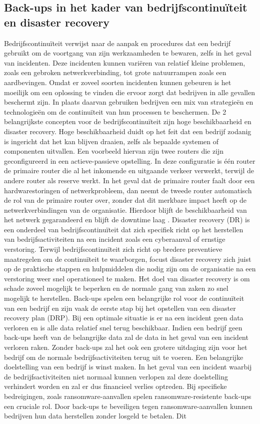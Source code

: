 \subsection{Back-ups in het kader van bedrijfscontinuïteit en disaster recovery}
Bedrijfscontinuïteit verwijst naar de aanpak en procedures dat een bedrijf gebruikt om de voortgang van zijn werkzaamheden te bewaren, zelfs in het geval van incidenten. Deze incidenten kunnen variëren van relatief kleine problemen, zoals een gebroken netwerkverbinding, tot grote natuurrampen zoals een aardbevingen. Omdat er zoveel soorten incidenten kunnen gebeuren is het moeilijk om een oplossing te vinden die ervoor zorgt dat bedrijven in alle gevallen beschermt zijn. In plaats daarvan gebruiken bedrijven een mix van strategieën en technologieën om de continuïteit van hun processen te beschermen. De 2 belangrijkste concepten voor de bedrijfscontinuïteit zijn hoge beschikbaarheid en disaster recovery. Hoge beschikbaarheid duidt op het feit dat een bedrijf zodanig is ingericht dat het kan blijven draaien, zelfs als bepaalde systemen of componenten uitvallen. Een voorbeeld hiervan zijn twee routers die zijn geconfigureerd in een actieve-passieve opstelling. In deze configuratie is één router de primaire router die al het inkomende en uitgaande verkeer verwerkt, terwijl de andere router als reserve werkt. In het geval dat de primaire router faalt door een hardwarestoringen of netwerkprobleem, dan neemt de tweede router automatisch de rol van de primaire router over, zonder dat dit merkbare impact heeft op de netwerkverbindingen van de organisatie. Hierdoor blijft de beschikbaarheid van het netwerk gegarandeerd en blijft de downtime laag \autocite{Zhu2015}. Disaster recovery (DR) is een onderdeel van bedrijfscontinuïteit dat zich specifiek richt op het herstellen van bedrijfsactiviteiten na een incident zoals een cyberaanval of ernstige verstoring. Terwijl bedrijfscontinuïteit zich richt op bredere preventieve maatregelen om de continuïteit te waarborgen, focust disaster recovery zich juist op de praktische stappen en hulpmiddelen die nodig zijn om de organisatie na een verstoring weer snel operationeel te maken. Het doel van disaster recovery is om schade zoveel mogelijk te beperken en de normale gang van zaken zo snel mogelijk te herstellen. Back-ups spelen een belangrijke rol voor de continuïteit van een bedrijf en zijn vaak de eerste stap bij het opstellen van een disaster recovery plan (DRP). Bij een optimale situatie is er na een incident geen data verloren en is alle data relatief snel terug beschikbaar. Indien een bedrijf geen back-ups heeft van de belangrijke data zal de data in het geval van een incident verloren raken. Zonder back-ups zal het ook een grotere uitdaging zijn voor het bedrijf om de normale bedrijfsactiviteiten terug uit te voeren. Een belangrijke doelstelling van een bedrijf is winst maken. In het geval van een incident waarbij de bedrijfsactiviteiten niet normaal kunnen verlopen zal deze doelstelling verhindert worden en zal er dus financieel verlies optreden. Bij specifieke bedreigingen, zoals ransomware-aanvallen spelen ransomware-resistente back-ups een cruciale rol. Door back-ups te beveiligen tegen ransomware-aanvallen kunnen bedrijven hun data herstellen zonder losgeld te betalen. Dit 